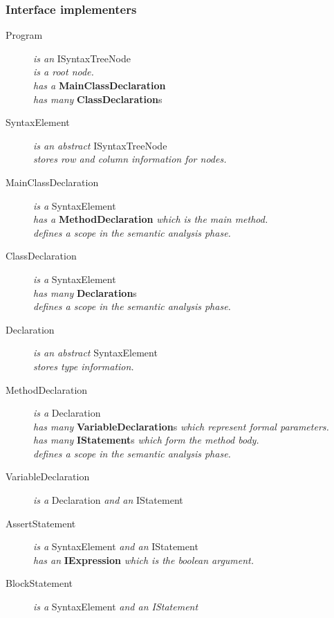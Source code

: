 \documentclass[a4paper,11pt]{article}
\begin{document}
\subsubsection{Interface implementers}
\begin{description}
\item[Program] \emph{is an} ISyntaxTreeNode \\
\emph{is a root node.} \\
\emph{has a} \textbf{MainClassDeclaration} \\
\emph{has many} \textbf{ClassDeclaration}s
\\
\item[SyntaxElement] \emph{is an abstract} ISyntaxTreeNode \\
\emph{stores row and column information for nodes.}
\\
\item[MainClassDeclaration] \emph{is a} SyntaxElement \\
\emph{has a} \textbf{MethodDeclaration} \emph{which is the main method.} \\
\emph{defines a scope in the semantic analysis phase.}
\item[ClassDeclaration] \emph{is a} SyntaxElement \\
\emph{has many} \textbf{Declaration}s \\
\emph{defines a scope in the semantic analysis phase.}
\\
\item[Declaration] \emph{is an abstract} SyntaxElement \\
\emph{stores type information.}
\item[MethodDeclaration] \emph{is a} Declaration \\
\emph{has many} \textbf{VariableDeclaration}s \emph{which represent formal parameters.} \\
\emph{has many} \textbf{IStatement}s \emph{which form the method body.} \\
\emph{defines a scope in the semantic analysis phase.}
\item[VariableDeclaration] \emph{is a} Declaration \emph{and an} IStatement
\\
\item[AssertStatement] \emph{is a} SyntaxElement \emph{and an} IStatement \\
\emph{has an} \textbf{IExpression} \emph{which is the boolean argument.}
\item[BlockStatement] \emph{is a} SyntaxElement \emph{and an IStatement} \\

\end{description}
\end{document}
